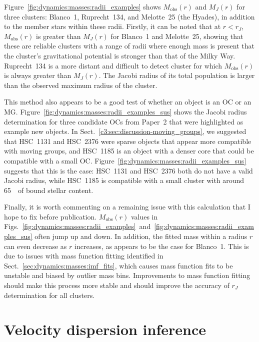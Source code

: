 Figure~\ref{fig:dynamics:masses:radii_examples} shows $M_\text{obs}(r)$ and $M_J(r)$ for three clusters: Blanco~1, Ruprecht~134, and Melotte~25 (the Hyades), in addition to the member stars within these radii. Firstly, it can be noted that at $r<r_J$, $M_\text{obs}(r)$ is greater than $M_J(r)$ for Blanco~1 and Melotte~25, showing that these are reliable clusters with a range of radii where enough mass is present that the cluster's gravitational potential is stronger than that of the Milky Way. Ruprecht~134 is a more distant and difficult to detect cluster for which $M_\text{obs}(r)$ is always greater than $M_J(r)$. The Jacobi radius of its total population is larger than the observed maximum radius of the cluster.

This method also appears to be a good test of whether an object is an OC or an MG. Figure~\ref{fig:dynamics:masses:radii_examples_sus} shows the Jacobi radius determination for three candidate OCs from Paper~2 that were highlighted as example new objects. In Sect.~\ref{c3:sec:discussion-moving_groups}, we suggested that HSC~1131 and HSC~2376 were sparse objects that appear more compatible with moving groups, and HSC~1185 is an object with a denser core that could be compatible with a small OC. Figure~\ref{fig:dynamics:masses:radii_examples_sus} suggests that this is the case: HSC~1131 and HSC~2376 both do not have a valid Jacobi radius, while HSC~1185 is compatible with a small cluster with around 65~\MSun\ of bound stellar content.

Finally, it is worth commenting on a remaining issue with this calculation that I hope to fix before publication. $M_\text{obs}(r)$ values in Figs.~\ref{fig:dynamics:masses:radii_examples}~and~\ref{fig:dynamics:masses:radii_examples_sus} often jump up and down. In addition, the fitted mass within a radius $r$ can even decrease as $r$ increases, as appears to be the case for Blanco~1. This is due to issues with mass function fitting identified in Sect.~\ref{sec:dynamics:masses:imf_fits}, which causes mass function fits to be unstable and biased by outlier mass bins. Improvements to mass function fitting should make this process more stable and should improve the accuracy of $r_J$ determination for all clusters.



\section{Velocity dispersion inference}
\label{sec:dynamics:velocities}

